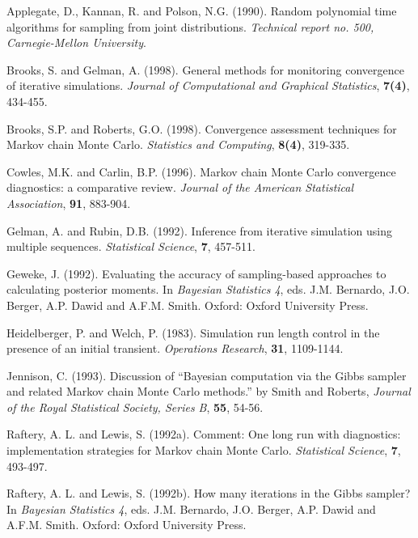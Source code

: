 \documentclass[12pt,letterpaper]{report}
\begin{document}
\begin{thebibliography}{99}
\bibitem{} Applegate, D., Kannan, R. and Polson, N.G. (1990). Random
polynomial time algorithms for sampling from joint distributions.
{\it Technical report no. 500, Carnegie-Mellon University}.

\bibitem{} Brooks, S. and Gelman, A. (1998). General methods for monitoring
convergence of iterative simulations. {\it Journal of Computational and
Graphical Statistics}, {\bf 7(4)}, 434-455.

\bibitem{} Brooks, S.P. and Roberts, G.O. (1998). Convergence assessment
techniques for Markov chain Monte Carlo. {\it Statistics and Computing},
{\bf 8(4)}, 319-335.

\bibitem{} Cowles, M.K. and Carlin, B.P. (1996). Markov chain Monte Carlo
convergence diagnostics: a comparative review. {\it Journal of the American
Statistical Association}, {\bf 91}, 883-904.

\bibitem{} Gelman, A. and Rubin, D.B. (1992). Inference from iterative
simulation using multiple sequences. {\it Statistical Science}, {\bf 7},
457-511.

\bibitem{} Geweke, J. (1992). Evaluating the accuracy of sampling-based
approaches to calculating posterior moments. In {\it Bayesian
Statistics 4}, eds. J.M. Bernardo, J.O. Berger, A.P. Dawid and
A.F.M. Smith. Oxford: Oxford University Press.

\bibitem{} Heidelberger, P. and Welch, P. (1983). Simulation run length
control in the presence of an initial transient. {\it Operations Research},
{\bf 31}, 1109-1144.

\bibitem{} Jennison, C. (1993). Discussion of ``Bayesian computation via
the Gibbs sampler and related Markov chain Monte Carlo methods.''
by Smith and Roberts, {\it Journal of the Royal Statistical Society,
Series B}, {\bf 55}, 54-56.

\bibitem{} Raftery, A. L. and Lewis, S. (1992a). Comment: One long run with
diagnostics: implementation strategies for Markov chain Monte Carlo.
{\it Statistical Science}, {\bf 7}, 493-497.

\bibitem{} Raftery, A. L. and Lewis, S. (1992b). How many iterations in the
Gibbs sampler? In {\it Bayesian Statistics 4}, eds. J.M. Bernardo, J.O.
Berger, A.P. Dawid and A.F.M. Smith. Oxford: Oxford University Press.
\end{thebibliography}
\end{document}
